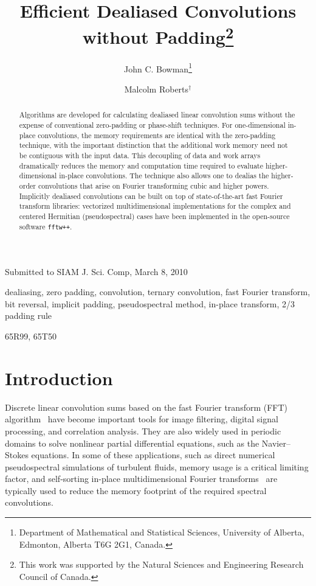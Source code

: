 \documentclass[final]{siamltex}
\begin{document}
\title{Efficient Dealiased Convolutions without Padding\thanks{This work
was supported by the Natural Sciences and Engineering Research Council of
Canada.}}
\author{John C. Bowman\thanks{Department of Mathematical and Statistical
Sciences, University of Alberta, Edmonton, Alberta T6G 2G1, Canada.}
\and Malcolm Roberts$^\dagger$}

\maketitle

{\centerline {Submitted to SIAM J. Sci. Comp, March 8, 2010}}

\begin{abstract}
Algorithms are developed for calculating dealiased linear convolution sums
without the expense of conventional zero-padding or phase-shift
techniques. For one-dimensional in-place convolutions, the memory
requirements are identical with the zero-padding technique, with the important
distinction that the additional work memory need not be contiguous with the
input data. This decoupling of data and work arrays dramatically reduces
the memory and computation time required to evaluate higher-dimensional
in-place convolutions. The technique also allows one to dealias the
higher-order convolutions that arise on Fourier transforming cubic and higher powers.
Implicitly dealiased convolutions can be built on top of state-of-the-art
fast Fourier transform libraries: vectorized multidimensional implementations
for the complex and centered Hermitian (pseudospectral) cases have
been implemented in the open-source software {\tt fftw++}.
\end{abstract} 

\begin{keywords} 
dealiasing, zero padding, convolution, ternary convolution, 
fast Fourier transform, bit reversal, implicit padding, pseudospectral
method, in-place transform, 2/3 padding rule 
\end{keywords}

\begin{AMS}
65R99, 65T50
\end{AMS}

\pagestyle{myheadings}



\section{Introduction}
Discrete linear convolution sums based on the fast Fourier transform
(FFT) algorithm~\cite{Gauss1866,Cooley65} have become important tools
for image filtering, digital signal processing, and correlation
analysis. They are also widely used in periodic domains to solve
nonlinear partial differential equations, such as the Navier--Stokes
equations. In some of these applications, such as
direct numerical pseudospectral simulations of turbulent fluids,
memory usage is a critical limiting factor, and self-sorting in-place
multidimensional Fourier transforms~\cite{Temperton91} are typically used to
reduce the memory footprint of the required spectral convolutions.
\end{document}
